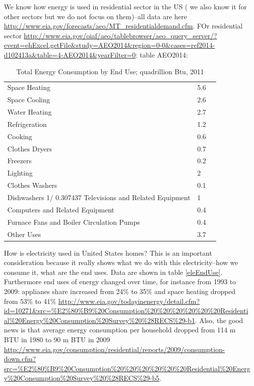 \documentclass[10pt, letterpaper]{article}
\begin{document}
\begin{spacing}{1.4}
We know how energy is used in residential sector in the US ( we also know it for
other sectors but we do not focus on them)--all data are here
\url{http://www.eia.gov/forecasts/aeo/MT_residentialdemand.cfm}. FOr residential
sector
\url{http://www.eia.gov/oiaf/aeo/tablebrowser/aeo_query_server/?event=ehExcel.getFile&study=AEO2014&region=0-0&cases=ref2014-d102413a&table=4-AEO2014&yearFilter=0}:
table AEO2014: 


\begin{table}[H]\centering\footnotesize
\caption{\label{freq_im_god} Total Energy Consumption by End Use; quadrillion
  Btu, 2011}
\begin{tabular}{lll}   \hline 
Space Heating&	5.6\\
Space Cooling&	2.6\\
Water Heating&	2.7\\
Refrigeration&	1.2\\
Cooking&	0.6\\
Clothes Dryers&	0.7\\
Freezers&	0.2\\
Lighting&	2\\
Clothes Washers&	0.1\\
Dishwashers 1/	0.307437
Televisions and Related Equipment&	1\\
Computers and Related Equipment &	0.4\\
Furnace Fans and Boiler Circulation Pumps&	0.4\\
Other Uses&	3.7\\\hline
\end{tabular}\end{table}

How is electricity used in United States homes? This is an important
consideration because it really shows what we do with this electricity--how we
consume it, what are the end uses. Data are shown in table
\ref{eleEndUse}. Furthermore end uses of energy changed over time, for instance
 from 1993 to 2009: applianes share increased from 24\% to 35\% and space
 heating dropped from 53\% to 41\%
 \url{http://www.eia.gov/todayinenergy/detail.cfm?id=10271&src=%E2%80%B9%20Consumption%20%20%20%20%20%20Residential%20Energy%20Consumption%20Survey%20%28RECS%29-b1}. 
Also, the good news is that average energy consumption per household dropped from 114 m BTU in 1980 to
90 m BTU in 2009 \url{http://www.eia.gov/consumption/residential/reports/2009/consumption-down.cfm?src=%E2%80%B9%20Consumption%20%20%20%20%20%20Residential%20Energy%20Consumption%20Survey%20%28RECS%29-b5}.  



\end{spacing}
\end{document}
